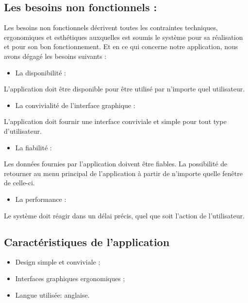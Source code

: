 \subsection{Les besoins non fonctionnels :}
Les besoins non fonctionnels décrivent toutes les contraintes techniques, ergonomiques et esthétiques auxquelles est soumis le système pour sa réalisation et pour son bon fonctionnement. Et en ce qui concerne notre application, nous avons dégagé les besoins suivants :
\begin{itemize}
\item  La disponibilité : 
\end{itemize}
 L’application doit être disponible pour être utilisé par n’importe quel utilisateur.
\begin{itemize}
\item  La convivialité de l’interface graphique : 
\end{itemize}
 L’application doit fournir une interface conviviale et simple pour tout type d’utilisateur.
\begin{itemize}
\item  La fiabilité : 
\end{itemize}
Les données fournies par l’application doivent être fiables. La possibilité de retourner au menu principal de l’application à partir de n’importe quelle fenêtre de celle-ci.
\begin{itemize}
\item  La performance  : 
\end{itemize}
Le système doit réagir dans un délai précis, quel que soit l’action de l’utilisateur.
\subsection{Caractéristiques de l’application }
\begin{itemize}
\item  Design simple et conviviale ;
\item Interfaces graphiques ergonomiques ;    
\item  Langue utilisée: anglaise.
\end{itemize}

